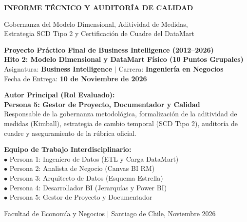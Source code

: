 \documentclass[11pt,a4paper]{article}
\begin{document}
\begin{titlepage}
    \centering
    \vspace*{0.5cm}
    {\Huge \bfseries \color{primaryblue} INFORME TÉCNICO Y AUDITORÍA DE CALIDAD\par}
    \vspace{0.4cm}
    {\LARGE \color{secondaryblue} Gobernanza del Modelo Dimensional, Aditividad de Medidas,\\Estrategia SCD Tipo 2 y Certificación de Cuadre del DataMart\par}
    \vspace{0.8cm}

    \begin{tcolorbox}[colback=lightbg, colframe=primaryblue, width=\textwidth, arc=3mm]
        \centering
        \large \textbf{Proyecto Práctico Final de Business Intelligence (2012--2026)}\\[2mm]
        \normalsize \textbf{Hito 2: Modelo Dimensional y DataMart Físico (10 Puntos Grupales)}\\[1mm]
        Asignatura: \textbf{Business Intelligence} $|$ Carrera: \textbf{Ingeniería en Negocios}\\[1mm]
        Fecha de Entrega: \textbf{10 de Noviembre de 2026}
    \end{tcolorbox}

    \vspace{1.5cm}
    \begin{minipage}{0.48\textwidth}
        \textbf{Autor Principal (Rol Evaluado):}\\
        \textbf{\color{primaryblue}Persona 5: Gestor de Proyecto, Documentador y Calidad}\\
        {\small Responsable de la gobernanza metodológica, formalización de la aditividad de medidas (Kimball), estrategia de cambio temporal (SCD Tipo 2), auditoría de cuadre y aseguramiento de la rúbrica oficial.}
    \end{minipage}
    \hfill
    \begin{minipage}{0.48\textwidth}
        \textbf{Equipo de Trabajo Interdisciplinario:}\\
        $\bullet$ Persona 1: Ingeniero de Datos (ETL y Carga DataMart)\\
        $\bullet$ Persona 2: Analista de Negocio (Canvas BI RM)\\
        $\bullet$ Persona 3: Arquitecto de Datos (Esquema Estrella)\\
        $\bullet$ Persona 4: Desarrollador BI (Jerarquías y Power BI)\\
        $\bullet$ Persona 5: Gestor de Proyecto y Documentador
    \end{minipage}

    \vfill
    {\small \color{darkgray} Facultad de Economía y Negocios $|$ Santiago de Chile, Noviembre 2026}\par
\end{titlepage}
\end{document}
